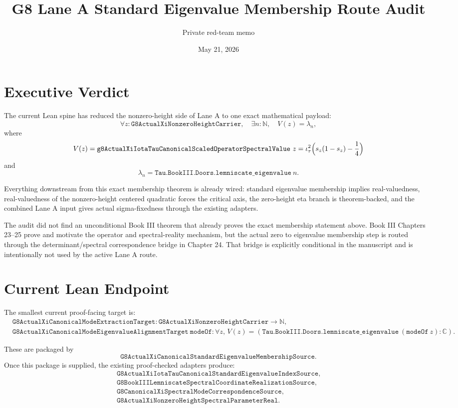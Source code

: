 \documentclass[11pt]{article}
\title{G8 Lane A Standard Eigenvalue Membership Route Audit}
\author{Private red-team memo}
\date{May 21, 2026}
\begin{document}
\maketitle

\section*{Executive Verdict}

The current Lean spine has reduced the nonzero-height side of Lane A to one
exact mathematical payload:
\[
  \forall z : \texttt{G8ActualXiNonzeroHeightCarrier},\quad
  \exists n : \mathbb{N},\quad
  V(z) = \lambda_n,
\]
where
\[
  V(z) =
  \texttt{g8ActualXiIotaTauCanonicalScaledOperatorSpectralValue}\ z
  = \iota_\tau^2\Bigl(s_z(1-s_z)-\frac14\Bigr)
\]
and
\[
  \lambda_n =
  \texttt{Tau.BookIII.Doors.lemniscate\_eigenvalue}\ n.
\]

Everything downstream from this exact membership theorem is already wired:
standard eigenvalue membership implies real-valuedness, real-valuedness of the
nonzero-height centered quadratic forces the critical axis, the zero-height
eta branch is theorem-backed, and the combined Lane A input gives actual
sigma-fixedness through the existing adapters.

The audit did not find an unconditional Book III theorem that already proves
the exact membership statement above.  Book III Chapters 23--25 prove and
motivate the operator and spectral-reality mechanism, but the actual zero to
eigenvalue membership step is routed through the determinant/spectral
correspondence bridge in Chapter 24.  That bridge is explicitly conditional in
the manuscript and is intentionally not used by the active Lane A route.

\section*{Current Lean Endpoint}

The smallest current proof-facing target is:
\[
\begin{aligned}
&\texttt{G8ActualXiCanonicalModeExtractionTarget} :
  \texttt{G8ActualXiNonzeroHeightCarrier} \to \mathbb{N},\\
&\texttt{G8ActualXiCanonicalModeEigenvalueAlignmentTarget}\ \texttt{modeOf} :
  \forall z,\,
  V(z) =
  (\texttt{Tau.BookIII.Doors.lemniscate\_eigenvalue}\ (\texttt{modeOf}\ z)
  : \mathbb{C}).
\end{aligned}
\]

These are packaged by
\[
  \texttt{G8ActualXiCanonicalStandardEigenvalueMembershipSource}.
\]
Once this package is supplied, the existing proof-checked adapters produce:
\[
\begin{gathered}
  \texttt{G8ActualXiIotaTauCanonicalStandardEigenvalueIndexSource},\\
  \texttt{G8BookIIILemniscateSpectralCoordinateRealizationSource},\\
  \texttt{G8CanonicalXiSpectralModeCorrespondenceSource},\\
  \texttt{G8ActualXiNonzeroHeightSpectralParameterReal}.
\end{gathered}
\]
\end{document}
